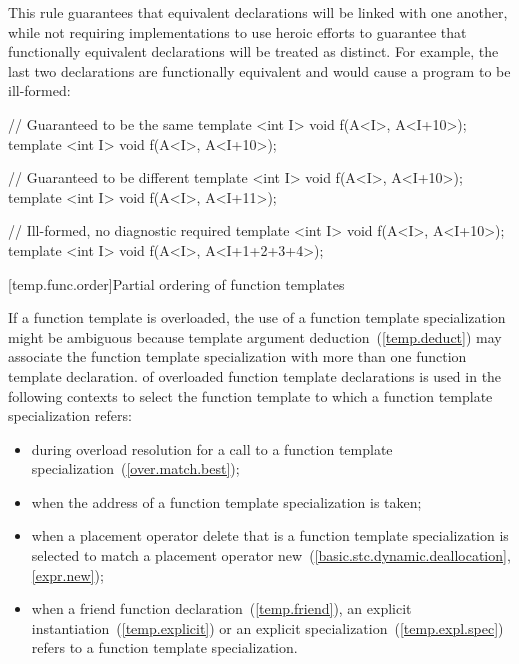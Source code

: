 \pnum
\begin{note}
This rule guarantees that equivalent declarations will be linked with
one another, while not requiring implementations to use heroic efforts
to guarantee that functionally equivalent declarations will be treated
as distinct.
For example, the last two declarations are functionally
equivalent and would cause a program to be ill-formed:

\begin{codeblock}
// Guaranteed to be the same
template <int I> void f(A<I>, A<I+10>);
template <int I> void f(A<I>, A<I+10>);

// Guaranteed to be different
template <int I> void f(A<I>, A<I+10>);
template <int I> void f(A<I>, A<I+11>);

// Ill-formed, no diagnostic required
template <int I> void f(A<I>, A<I+10>);
template <int I> void f(A<I>, A<I+1+2+3+4>);
\end{codeblock}
\end{note}

[temp.func.order]{Partial ordering of function templates}

\pnum
{}%
%
If a function template is overloaded,
the use of a function template specialization might be ambiguous because
template argument deduction~(\ref{temp.deduct}) may associate the function
template specialization with more than one function template declaration.
of overloaded function template declarations is used in the following contexts
to select the function template to which a function template specialization
refers:

\begin{itemize}
\item
during overload resolution for a call to a function template specialization~(\ref{over.match.best});
\item
when the address of a function template specialization is taken;
\item
when a placement operator delete that is a
function template
specialization
is selected to match a placement operator new~(\ref{basic.stc.dynamic.deallocation}, \ref{expr.new});
\item
when a friend function declaration~(\ref{temp.friend}), an
explicit instantiation~(\ref{temp.explicit}) or an explicit specialization~(\ref{temp.expl.spec}) refers to
a function template specialization.
\end{itemize}

